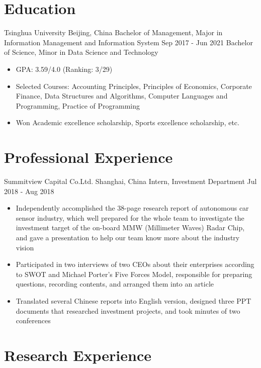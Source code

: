 \documentclass{resumeEN}
\begin{document}

    \section{Education}

    \Experience
    {Tsinghua University}
    {Beijing, China}
    {Bachelor of Management, Major in Information Management and Information System}
    {Sep 2017 - Jun 2021}
    Bachelor of Science, Minor in Data Science and Technology
    \begin{itemize}
        \item GPA: 3.59/4.0 (Ranking: 3/29)
        \item Selected Courses: Accounting Principles, Principles of Economics, Corporate Finance, Data Structures and Algorithms, Computer Languages and Programming, Practice of Programming
        \item Won Academic excellence scholarship, Sports excellence scholarship, etc.
    \end{itemize}

    \section{Professional Experience}

    \Experience
    {Summitview Capital Co.Ltd.}
    {Shanghai, China}
    {Intern, Investment Department}
    {Jul 2018 - Aug 2018}

    \begin{itemize}
        \item Independently accomplished the 38-page research report of autonomous car sensor industry, which well prepared for the whole team to investigate the investment target of the on-board MMW (Millimeter Waves) Radar Chip, and gave a presentation to help our team know more about the industry vision
        \item Participated in two interviews of two CEOs about their enterprises according to SWOT and Michael Porter's Five Forces Model, responsible for preparing questions, recording contents, and arranged them into an article
        \item Translated several Chinese reports into English version, designed three PPT documents that researched investment projects, and took minutes of two conferences
    \end{itemize}

    \section{Research Experience}
\end{document}
